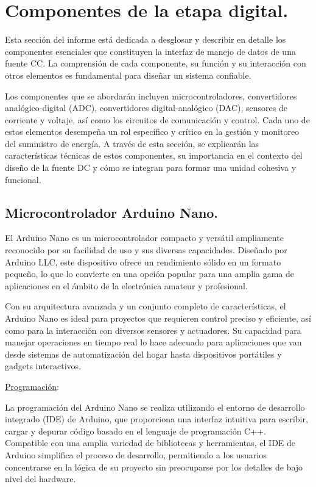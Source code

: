 \section{Componentes de la etapa digital.}
Esta sección del informe está dedicada a desglosar y describir en detalle los componentes esenciales que constituyen la interfaz de manejo de datos de una fuente CC. La comprensión de cada componente, su función y su interacción con otros elementos es fundamental para diseñar un sistema confiable.\par 
Los componentes que se abordarán incluyen microcontroladores, convertidores analógico-digital (ADC), convertidores digital-analógico (DAC), sensores de corriente y voltaje, así como los circuitos de comunicación y control. Cada uno de estos elementos desempeña un rol específico y crítico en la gestión y monitoreo del suministro de energía. A través de esta sección, se explicarán las características técnicas de estos componentes, su importancia en el contexto del diseño de la fuente DC y cómo se integran para formar una unidad cohesiva y funcional.\par 

\subsection{Microcontrolador Arduino Nano.}
El Arduino Nano es un microcontrolador compacto y versátil ampliamente reconocido por su facilidad de uso y sus diversas capacidades. Diseñado por Arduino LLC, este dispositivo ofrece un rendimiento sólido en un formato pequeño, lo que lo convierte en una opción popular para una amplia gama de aplicaciones en el ámbito de la electrónica amateur y profesional.\par 
Con su arquitectura avanzada y un conjunto completo de características, el Arduino Nano es ideal para proyectos que requieren control preciso y eficiente, así como para la interacción con diversos sensores y actuadores. Su capacidad para manejar operaciones en tiempo real lo hace adecuado para aplicaciones que van desde sistemas de automatización del hogar hasta dispositivos portátiles y gadgets interactivos.\par 

\underline{Programación}: \par 
La programación del Arduino Nano se realiza utilizando el entorno de desarrollo integrado (IDE) de Arduino, que proporciona una interfaz intuitiva para escribir, cargar y depurar código basado en el lenguaje de programación C++. Compatible con una amplia variedad de bibliotecas y herramientas, el IDE de Arduino simplifica el proceso de desarrollo, permitiendo a los usuarios concentrarse en la lógica de su proyecto sin preocuparse por los detalles de bajo nivel del hardware.\par 


